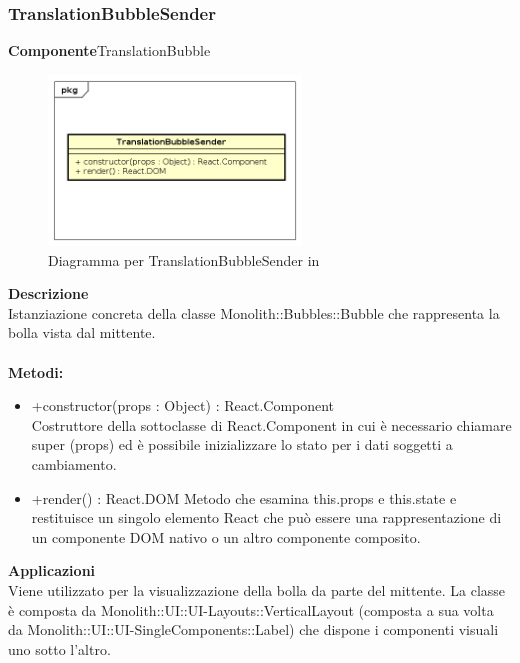 \subsubsection{TranslationBubbleSender}
\textbf{Componente}TranslationBubble\\
   \FloatBarrier
   \begin{figure}[ht]
   \centering
   \includegraphics[width=0.6\textwidth]{img/single-TranslationBubbleSender}
   \caption{{Diagramma per TranslationBubbleSender in }}
\end{figure}
\FloatBarrier
\textbf{Descrizione}\\
Istanziazione concreta della classe Monolith::Bubbles::Bubble che rappresenta la bolla vista dal mittente.
\\
\\
\textbf{Metodi:} 
\begin{itemize}
\item +constructor(props : Object) : React.Component 
\\
Costruttore della sottoclasse di React.Component in cui è necessario chiamare super (props) ed è possibile inizializzare lo stato per i dati soggetti a cambiamento.

\item +render() : React.DOM
Metodo che esamina this.props e this.state e restituisce un singolo elemento React che può essere una rappresentazione di un componente DOM nativo o un altro componente composito.

\end{itemize} 


\textbf{Applicazioni}\\
Viene utilizzato per la visualizzazione della bolla da parte del mittente.
La classe è composta da Monolith::UI::UI-Layouts::VerticalLayout (composta a sua volta da Monolith::UI::UI-SingleComponents::Label) che dispone i componenti visuali uno sotto l'altro. 


\clearpage

